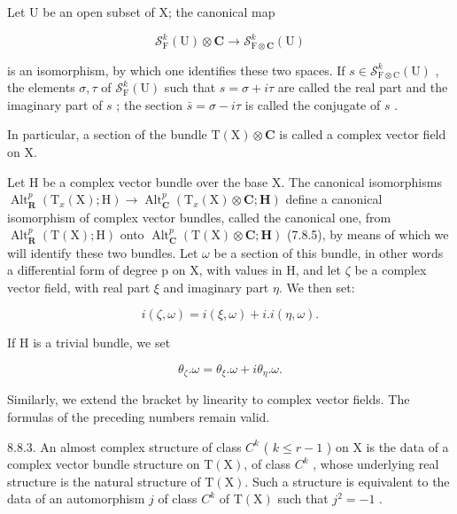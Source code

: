 Let U be an open subset of X; the canonical map

\[
\mathcal {S} _ {\mathrm{F}} ^ {k} (\mathrm{U}) \otimes \mathbf {C} \rightarrow \mathcal {S} _ {\mathrm{F} \otimes \mathbf {C}} ^ {k} (\mathrm{U})
\]

is an isomorphism, by which one identifies these two spaces. If \(s \in \mathcal{S}_{\mathrm{F} \otimes \mathrm{C}}^{k}(\mathrm{U})\) , the elements \(\sigma, \tau\) of \(\mathcal{S}_{\mathrm{F}}^{k}(\mathrm{U})\) such that \(s = \sigma + i\tau\) are called the real part and the imaginary part of \(s\) ; the section \(\bar{s} = \sigma - i\tau\) is called the conjugate of \(s\) .

In particular, a section of the bundle \(\mathrm{T}(\mathrm{X}) \otimes \mathbf{C}\) is called a complex vector field on X.

Let H be a complex vector bundle over the base X. The canonical isomorphisms \(\operatorname{Alt}_{\mathbf{R}}^{p}(\mathrm{T}_{x}(\mathrm{X});\mathrm{H})\to\operatorname{Alt}_{\mathbf{C}}^{p}(\mathrm{T}_{x}(\mathrm{X})\otimes\mathbf{C};\mathbf{H})\) define a canonical isomorphism of complex vector bundles, called the canonical one, from \(\operatorname{Alt}_{\mathbf{R}}^{p}(\mathrm{T}(\mathrm{X});\mathrm{H})\) onto \(\operatorname{Alt}_{\mathbf{C}}^{p}(\mathrm{T}(\mathrm{X})\otimes\mathbf{C};\mathbf{H})\) (7.8.5), by means of which we will identify these two bundles. Let \(\omega\) be a section of this bundle, in other words a differential form of degree p on X, with values in H, and let \(\zeta\) be a complex vector field, with real part \(\xi\) and imaginary part \(\eta\). We then set:

\[
i (\zeta , \omega) = i (\xi , \omega) + i. i (\eta , \omega).
\]

If H is a trivial bundle, we set

\[
\theta_ {\zeta}. \omega = \theta_ {\xi}. \omega + i \theta_ {\eta}. \omega .
\]

Similarly, we extend the bracket by linearity to complex vector fields. The formulas of the preceding numbers remain valid.

8.8.3. An almost complex structure of class \(C^{k}\) ( \(k \leqslant r - 1\) ) on X is the data of a complex vector bundle structure on \(\mathrm{T}(\mathrm{X})\), of class \(C^{k}\) , whose underlying real structure is the natural structure of \(\mathrm{T}(\mathrm{X})\). Such a structure is equivalent to the data of an automorphism \(j\) of class \(C^{k}\) of \(\mathrm{T}(\mathrm{X})\) such that \(j^{2} = -1\) .

